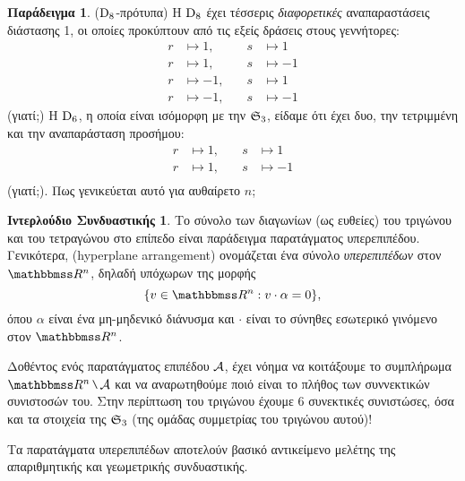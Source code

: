 \documentclass[12pt,a4paper,reqno]{amsart}
\theoremstyle{definition}
\newtheorem*{example}{Παράδειγμα}
\newtheorem*{combInterlude}{Ιντερλούδιο Συνδυαστικής}
\newcommand{\defn}[1]{{\color{mylightblue}{#1}}}
\begin{document}
\begin{example}{\rm($\mathrm{D}_8$-πρότυπα)}
    Η $\mathrm{D}_8$ έχει τέσσερις \emph{διαφορετικές} αναπαραστάσεις διάστασης 1, οι οποίες προκύπτουν από τις εξείς δράσεις στους γεννήτορες:
    \[
    \begin{aligned}
    r &\mapsto 1, \quad &s &\mapsto 1\\
    r &\mapsto 1, \quad &s &\mapsto -1\\
    r &\mapsto -1, \quad &s &\mapsto 1\\
    r &\mapsto -1, \quad &s &\mapsto -1
    \end{aligned}
    \]
    (γιατί;) Η $\mathrm{D}_6$, η οποία είναι ισόμορφη με την $\mathfrak{S}_3$, είδαμε ότι έχει δυο, την τετριμμένη και την αναπαράσταση προσήμου:
    \[
    \begin{aligned}
    r &\mapsto 1, \quad &s &\mapsto 1\\
    r &\mapsto 1, \quad &s &\mapsto -1\\
    \end{aligned}
    \]
    (γιατί;). Πως γενικεύεται αυτό για αυθαίρετο $n$;
\end{example}

\begin{combInterlude}
    Το σύνολο των διαγωνίων (ως ευθείες) του τριγώνου και του τετραγώνου στο επίπεδο είναι παράδειγμα παρατάγματος υπερεπιπέδου. Γενικότερα, \defn{παράταγμα υπερεπιπέδου} (hyperplane arrangement) ονομάζεται ένα σύνολο \emph{υπερεπιπέδων} στον $\RR^n$, δηλαδή υπόχωρων της μορφής 
    \[
    \{v \in \RR^n : v\cdot\alpha = 0\},
    \]
    όπου $\alpha$ είναι ένα μη-μηδενικό διάνυσμα και $\cdot$ είναι το σύνηθες εσωτερικό γινόμενο στον $\RR^n$.

    Δοθέντος ενός παρατάγματος επιπέδου $\mathcal{A}$, έχει νόημα να κοιτάξουμε το συμπλήρωμα $\RR^n\sm\aA$ και να αναρωτηθούμε ποιό είναι το πλήθος των συννεκτικών συνιστοσών του. Στην περίπτωση του τριγώνου έχουμε 6 συνεκτικές συνιστώσες, όσα και τα στοιχεία της $\mathfrak{S}_3$ (της ομάδας συμμετρίας του τριγώνου αυτού)! 

    Τα παρατάγματα υπερεπιπέδων αποτελούν βασικό αντικείμενο μελέτης της απαριθμητικής και γεωμετρικής συνδυαστικής. 
\end{combInterlude}
\end{document}
